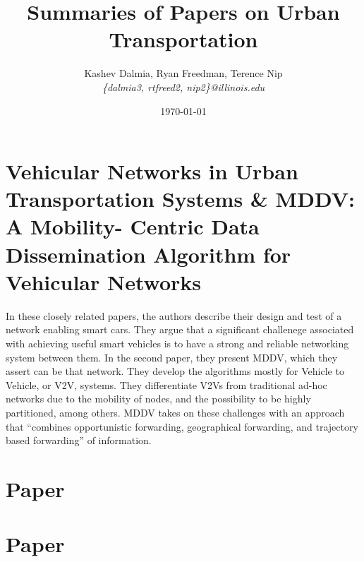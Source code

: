 \documentclass[a4paper]{article}
\title{Summaries of Papers on Urban Transportation}
\author{Kashev Dalmia, Ryan Freedman, Terence Nip \\
        \textit{\{dalmia3, rtfreed2, nip2\}@illinois.edu}
       }
\date{\today}
\begin{document}
\maketitle

\section{Vehicular Networks in Urban Transportation Systems \& MDDV: A Mobility-
Centric Data Dissemination Algorithm for Vehicular Networks}

In these closely related papers, the authors describe their design and test of a
network enabling smart cars. They argue that a significant challenege associated
with achieving useful smart vehicles is to have a strong and reliable networking
system between them. In the second paper, they present MDDV, which they assert
can be that network. They develop the algorithms mostly for Vehicle to Vehicle,
or V2V, systems. They differentiate V2Vs from traditional ad-hoc networks due to
the mobility of nodes, and the possibility to be highly partitioned, among
others. MDDV takes on these challenges with an approach that ``combines
opportunistic forwarding, geographical forwarding, and trajectory based
forwarding'' of information.

\section{Paper}
\section{Paper}
\end{document}
